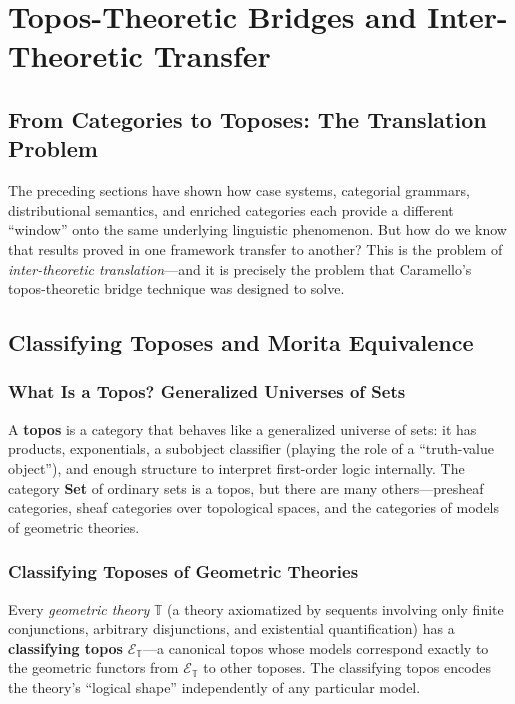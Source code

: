 \documentclass[
]{article}
\numberwithin{equation}{section}
\begin{document}
\section{Topos-Theoretic Bridges and Inter-Theoretic
Transfer}\label{sec:topos-theory}

\subsection{From Categories to Toposes: The Translation
Problem}\label{from-categories-to-toposes-the-translation-problem}

The preceding sections have shown how case systems, categorial grammars,
distributional semantics, and enriched categories each provide a
different ``window'' onto the same underlying linguistic phenomenon. But
how do we know that results proved in one framework transfer to another?
This is the problem of \emph{inter-theoretic translation}---and it is
precisely the problem that Caramello's
\citeyearpar{caramello2016bridges} topos-theoretic bridge technique was
designed to solve.

\subsection{Classifying Toposes and Morita
Equivalence}\label{classifying-toposes-and-morita-equivalence}

\subsubsection{What Is a Topos? Generalized Universes of
Sets}\label{what-is-a-topos-generalized-universes-of-sets}

A \textbf{topos} is a category that behaves like a generalized universe
of sets: it has products, exponentials, a subobject classifier (playing
the role of a ``truth-value object''), and enough structure to interpret
first-order logic internally. The category \textbf{Set} of ordinary sets
is a topos, but there are many others---presheaf categories, sheaf
categories over topological spaces, and the categories of models of
geometric theories.

\subsubsection{Classifying Toposes of Geometric
Theories}\label{classifying-toposes-of-geometric-theories}

Every \emph{geometric theory} \(\mathbb{T}\) (a theory axiomatized by
sequents involving only finite conjunctions, arbitrary disjunctions, and
existential quantification) has a \textbf{classifying topos}
\(\mathcal{E}_\mathbb{T}\)---a canonical topos whose models correspond
exactly to the geometric functors from \(\mathcal{E}_\mathbb{T}\) to
other toposes. The classifying topos encodes the theory's ``logical
shape'' independently of any particular model.
\end{document}
